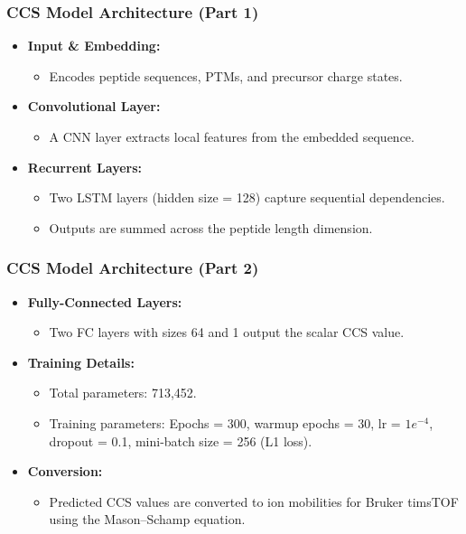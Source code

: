 \documentclass{beamer}
\begin{document}
\begin{frame}
  \frametitle{CCS Model Architecture (Part 1)}
  \begin{itemize}
    \item \textbf{Input \& Embedding:}
      \begin{itemize}
        \item Encodes peptide sequences, PTMs, and precursor charge states.
      \end{itemize}
    \item \textbf{Convolutional Layer:}
      \begin{itemize}
        \item A CNN layer extracts local features from the embedded sequence.
      \end{itemize}
    \item \textbf{Recurrent Layers:}
      \begin{itemize}
        \item Two LSTM layers (hidden size = 128) capture sequential dependencies.
        \item Outputs are summed across the peptide length dimension.
      \end{itemize}
  \end{itemize}
\end{frame}

\begin{frame}
  \frametitle{CCS Model Architecture (Part 2)}
  \begin{itemize}
    \item \textbf{Fully-Connected Layers:}
      \begin{itemize}
        \item Two FC layers with sizes 64 and 1 output the scalar CCS value.
      \end{itemize}
    \item \textbf{Training Details:}
      \begin{itemize}
        \item Total parameters: 713,452.
        \item Training parameters: Epochs = 300, warmup epochs = 30, lr = $1e^{-4}$, dropout = 0.1, mini-batch size = 256 (L1 loss).
      \end{itemize}
    \item \textbf{Conversion:}
      \begin{itemize}
        \item Predicted CCS values are converted to ion mobilities for Bruker timsTOF using the Mason–Schamp equation.
      \end{itemize}
  \end{itemize}
\end{frame}
\end{document}
